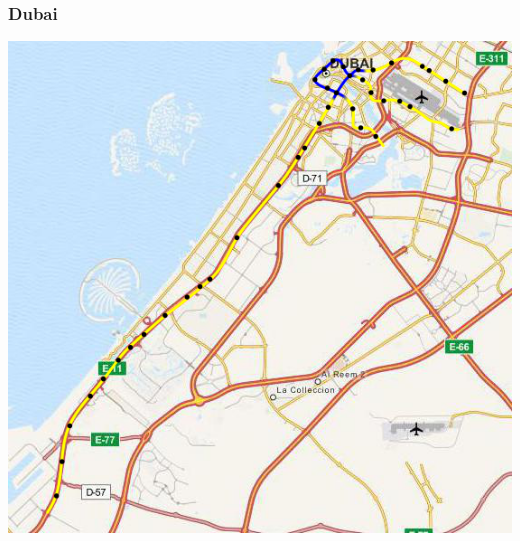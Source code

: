 \documentclass[xcolor=dvipsnames]{beamer}
\begin{document}

\begin{frame}
  \frametitle{Dubai}

  \begin{center}
    \includegraphics[height=.8\textheight]{data/Dubai.png}
  \end{center}
\end{frame}

\end{document}
